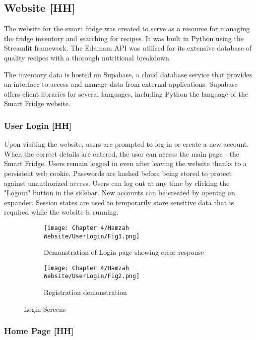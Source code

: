 \subsection{Website [HH]}

The website  for the smart fridge was created to serve as a resource for managing the fridge inventory and searching for recipes.
It was built in Python using the Streamlit framework.
The Edamam API was utilised for its extensive database of quality recipes with a thorough nutritional breakdown.

The inventory data is hosted on Supabase, a cloud database service that provides an interface to access and manage data from external applications.
Supabase offers client libraries for several languages, including Python the language of the Smart Fridge website.

\subsubsection{User Login [HH]}

Upon visiting the website, users are prompted to log in or create a new account.
When the correct details are entered, the user can access the main page - the Smart Fridge.
Users remain logged in even after leaving the website thanks to a persistent web cookie.
Passwords are hashed before being stored to protect against unauthorized access.
Users can log out at any time by clicking the "Logout" button in the sidebar.
New accounts can be created by opening an expander.
Session states are used to temporarily store sensitive data that is required while the website is running.


\begin{figure}[H]
    \begin{subfigure}{.5\textwidth}
        \centering
        \texttt{[image: Chapter 4/Hamzah Website/UserLogin/Fig1.png]}
        \caption{Demonstration of Login page showing error response}
    \end{subfigure}%
    \begin{subfigure}{.5\textwidth}
        \centering
        \texttt{[image: Chapter 4/Hamzah Website/UserLogin/Fig2.png]}
        \caption{Registration demonstration}
    \end{subfigure}
    \caption{Login Screens}
\end{figure}

\subsubsection{Home Page [HH]}

